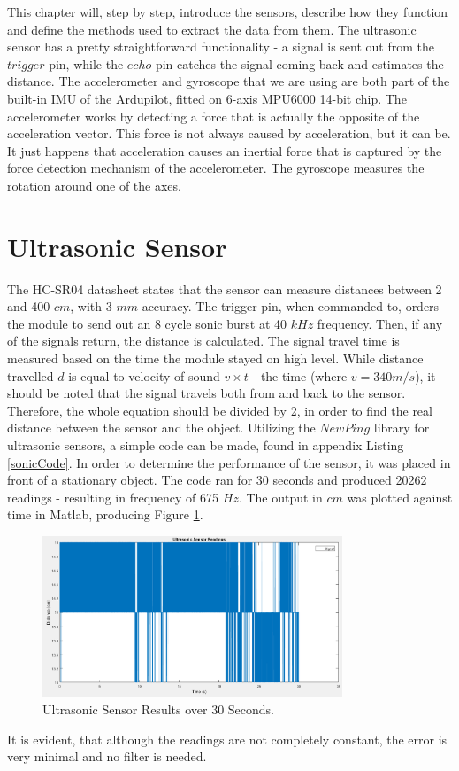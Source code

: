 This chapter will, step by step, introduce the sensors, describe how they function and define the methods used to extract the data from them. The ultrasonic sensor has a pretty straightforward functionality - a signal is sent out from the $trigger$ pin, while the $echo$ pin catches the signal coming back and estimates the distance. The accelerometer and gyroscope that we are using are both part of the built-in IMU of the Ardupilot, fitted on 6-axis MPU6000 14-bit chip. The accelerometer works by detecting a force that is actually the opposite of the acceleration vector. This force is not always caused by acceleration, but it can be. It just happens that acceleration causes an inertial force that is captured by the force detection mechanism of the accelerometer. The gyroscope measures the rotation around one of the axes.

\section{Ultrasonic Sensor}
The HC-SR04 datasheet\cite{HCDatasheet} states that the sensor can measure distances between 2 and 400 $cm$, with 3 $mm$ accuracy. The trigger pin, when commanded to, orders the module to send out an 8 cycle sonic burst at 40 $kHz$ frequency. Then, if any of the signals return, the distance is calculated. The signal travel time is measured based on the time the module stayed on high level. While distance travelled $d$ is equal to velocity of sound $v \times t$ - the time (where $v = 340m/s$), it should be noted that the signal travels both from and back to the sensor. Therefore, the whole equation should be divided by 2, in order to find the real distance between the sensor and the object.
Utilizing the $NewPing$ library for ultrasonic sensors, a simple code can be made, found in appendix Listing \ref{sonicCode}.
In order to determine the performance of the sensor, it was placed in front of a stationary object. The code ran for 30 seconds and produced 20262 readings - resulting in frequency of 675 $Hz$. The output in $cm$ was plotted against time in Matlab, producing Figure \ref{sonicPlot}.
\begin{figure}[H]
  \centering
    \includegraphics[width=0.8\textwidth]{images/sonicPlot.png}
	\caption{Ultrasonic Sensor Results over 30 Seconds.}
	\label{sonicPlot}
\end{figure} 
It is evident, that although the readings are not completely constant, the error is very minimal and no filter is needed.

